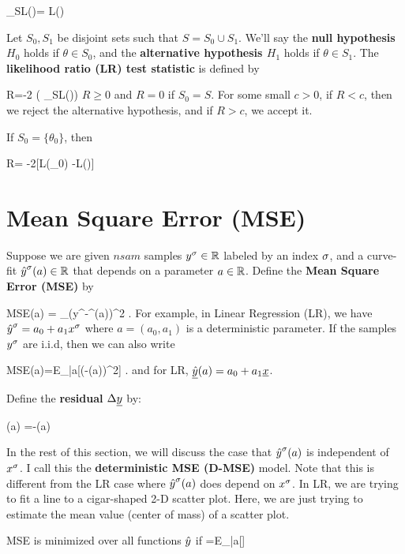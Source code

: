 \beq
\sup_{\theta\in S}L(\theta)=
L(\HAT{\theta})
\eeq


Let $S_0, S_1$ be disjoint sets such that
 $S=S_0\cup S_1$.
We'll say
the {\bf null hypothesis $H_0$} holds
 if $\theta\in S_0$,
and the {\bf alternative hypothesis $H_1$}
holds if
$\theta\in S_1$.
The {\bf likelihood ratio (LR) test statistic}
is defined by


\beq
R=-2\ln
\left(
{\sup_{\theta\in S}L(\theta)}\right)
\eeq
$R\geq 0$ and $R=0$ if  $S_0=S$.
For some small $c>0$,
if $R<c$, then we reject the alternative hypothesis,
and if $R>c$, we accept it.




If $S_0=\{\theta_0\}$,
then

\beq
R= -2[\ln L(\theta_0) -\ln L(\HAT{\theta})]
\eeq


\section{Mean Square Error (MSE)}

Suppose we are
given $nsam$ samples $y^\sigma\in{ \mathbb{R}}$
labeled by an index $\sigma$,
and a curve-fit ${\hat{y}}^\sigma(a)\in{ \mathbb{R}}$
that depends on a parameter $a\in{ \mathbb{R}}$.
Define the {\bf Mean Square
Error (MSE)}
by

\beq
MSE(a) = \sum_\s (y^\s-\haty^\s(a))^2
\;.
\eeq
For example, in Linear Regression (LR),
we have ${\hat{y}}^\sigma= a_0 + a_1 x^\sigma$
where $a=(a_0, a_1)$ is a deterministic
parameter.
If the samples $y^\sigma$
are i.i.d,
then we can also write


\beq
MSE(a)=E_{|a}[(\rvy-\ul{\haty}(a))^2]
\;.
\eeq
and for LR, $\ul{\haty}(a)=a_0+a_1\rvx$.

Define the {\bf residual} $\Delta\rvy$ by:


\beq
\Delta\rvy(a) =\rvy-\ul{\haty}(a)
\;\;\;
\eeq

In the rest of this section,
we will discuss the case that
${\hat{y}}^\sigma(a)$ is independent of $x^\sigma$.
I call
this the {\bf deterministic MSE (D-MSE)}
model.
Note that this
is different from the LR
case where
${\hat{y}}^\sigma(a)$ does depend on $x^\sigma$.
In LR, we are trying
to fit
a line to a cigar-shaped
2-D scatter plot.
Here, we are just trying
to estimate
the mean value (center of mass)
of a scatter plot.


\begin{claim}
MSE is minimized
over all functions ${\hat{y}}$ if
\beq
\haty =E_{|a}[\rvy]
\eeq
\end{claim}
\proof


